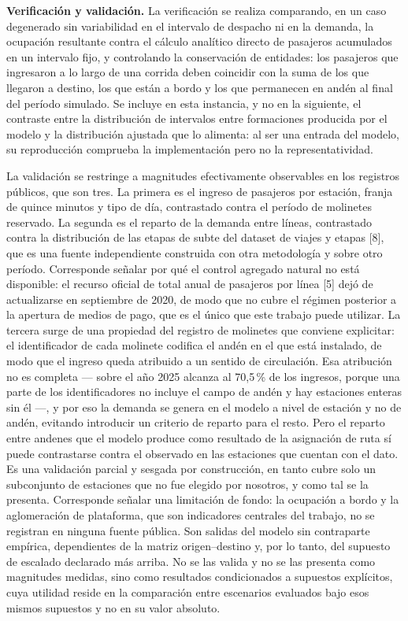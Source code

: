 \documentclass{article}
\begin{document}
\textbf{Verificación y validación.} La verificación se realiza comparando, en un caso degenerado sin
variabilidad en el intervalo de despacho ni en la demanda, la ocupación resultante contra el cálculo
analítico directo de pasajeros acumulados en un intervalo fijo, y controlando la conservación de entidades:
los pasajeros que ingresaron a lo largo de una corrida deben coincidir con la suma de los que llegaron a
destino, los que están a bordo y los que permanecen en andén al final del período simulado. Se incluye en
esta instancia, y no en la siguiente, el contraste entre la distribución de intervalos entre formaciones
producida por el modelo y la distribución ajustada que lo alimenta: al ser una entrada del modelo, su
reproducción comprueba la implementación pero no la representatividad.

La validación se restringe a magnitudes efectivamente observables en los registros públicos, que son tres. La
primera es el ingreso de pasajeros por estación, franja de quince minutos y tipo de día, contrastado contra
el período de molinetes reservado. La segunda es el reparto de la demanda entre líneas, contrastado contra la
distribución de las etapas de subte del dataset de viajes y etapas [8], que es una fuente independiente
construida con otra metodología y sobre otro período. Corresponde señalar por qué el control agregado natural
no está disponible: el recurso oficial de total anual de pasajeros por línea [5] dejó de actualizarse en
septiembre de 2020, de modo que no cubre el régimen posterior a la apertura de medios de pago, que es el
único que este trabajo puede utilizar. La tercera surge de una propiedad del registro de molinetes que
conviene explicitar:
el identificador de cada molinete codifica el andén en el que está instalado, de modo que el ingreso queda
atribuido a un sentido de circulación. Esa atribución no es completa --- sobre el año 2025 alcanza al
70,5\,\% de los ingresos, porque una parte de los identificadores no incluye el campo de andén y hay
estaciones enteras sin él ---, y por eso la demanda se genera en el modelo a nivel de estación y no de andén,
evitando introducir un criterio de reparto para el resto. Pero el reparto entre andenes que el modelo produce
como resultado de la asignación de ruta sí puede contrastarse contra el observado en las estaciones que
cuentan con el dato. Es una validación parcial y sesgada por construcción, en tanto cubre solo un subconjunto
de estaciones que no fue elegido por nosotros, y como tal se la presenta.
Corresponde señalar una limitación de fondo: la ocupación a bordo y la aglomeración de plataforma, que son
indicadores centrales del trabajo, no se registran en ninguna fuente pública. Son salidas del modelo sin
contraparte empírica, dependientes de la matriz origen--destino y, por lo tanto, del supuesto de escalado
declarado más arriba. No se las valida y no se las presenta como magnitudes medidas, sino como resultados
condicionados a supuestos explícitos, cuya utilidad reside en la comparación entre escenarios evaluados bajo
esos mismos supuestos y no en su valor absoluto.
\end{document}
